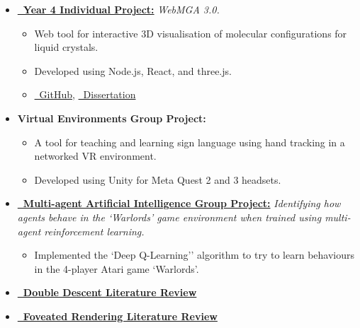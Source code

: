 \documentclass[10pt]{moderncv}
\begin{document}
{\begin{itemize}
\begin{itemize}
                \textit{Parameter-Wise Double Descent - A Unified Model or Not?}
                \begin{itemize}
                    \item Investigated and questioned the ubiquity of the double descent phenomenon by training a range of neural networks on the MNIST dataset.
                \end{itemize}
                \item\textbf{\href{https://joe-down.github.io/WebMGA-3/}{\faLink\ Year 4 Individual Project:}}
                \textit{WebMGA 3.0.}
                \begin{itemize}
                    \item Web tool for interactive 3D visualisation of molecular configurations for liquid crystals.
                    \item Developed using Node.js, React, and three.js.
                    \item \href{https://github.com/joe-down/WebMGA-3}{\faGithub\ GitHub}, \href{https://joe-down.github.io/Final-Year-Project-Dissertation/main.pdf}{\faLink\ Dissertation}
                \end{itemize}
                \item\textbf{Virtual Environments Group Project:}
                \begin{itemize}
                    \item A tool for teaching and learning sign language using hand tracking in a networked VR environment.
                    \item Developed using Unity for Meta Quest 2 and 3 headsets.
                \end{itemize}
                \item\textbf{\href{https://github.com/COMP0124-Group-9/Deep-Q-Learning-for-Atari-Warlords}{\faGithub\ Multi-agent Artificial Intelligence Group Project:}}
                \textit{Identifying how agents behave in the `Warlords' game environment when trained using multi-agent reinforcement learning.}
                \begin{itemize}
                    \item Implemented the `Deep Q-Learning'' algorithm to try to learn behaviours in the 4-player Atari game `Warlords'.
                \end{itemize}
                \item\textbf{\href{https://joe-down.github.io/Double-Descent-Review/review.pdf}{\faLink\ Double Descent Literature Review}}
                \item\textbf{\href{https://joe-down.github.io/Foveated-Rendering-Review/main.pdf}{\faLink\ Foveated Rendering Literature Review}}
            \end{itemize}
        \end{itemize}
        }
\end{document}
